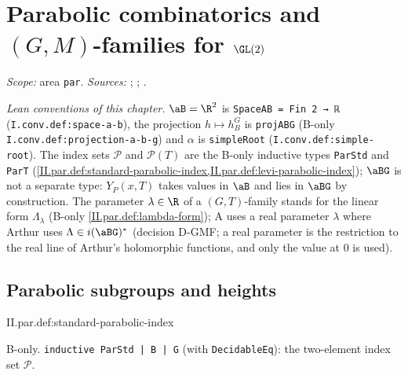 
\chapter{\texorpdfstring{Parabolic combinatorics and $(G,M)$-families for $\GL(2)$}{Parabolic combinatorics and (G,M)-families for GL(2)}}\label{ch:ch-02-parabolic}

\noindent\emph{Scope:} area \texttt{par}. \emph{Sources:} \cite[§§5, 17]{AIntro}; \cite[Lecture VII]{Gel}; \cite{A-FE2}.

\noindent\emph{Lean conventions of this chapter.} $\aB=\R^2$ is \texttt{SpaceAB = Fin 2 → ℝ} (\texttt{I.conv.def:space-a-b}), the projection
$h\mapsto h_B^G$ is \texttt{projABG} (B-only \texttt{I.conv.def:projection-a-b-g}) and $\alpha$ is \texttt{simpleRoot} (\texttt{I.conv.def:simple-root}). The index
sets $\mathcal P$ and $\mathcal P(T)$ are the B-only inductive types \texttt{ParStd} and \texttt{ParT} (\cref{II.par.def:standard-parabolic-index,II.par.def:levi-parabolic-index});
$\aBG$ is not a separate type: $Y_P(x,T)$ takes values in $\aB$ and lies in $\aBG$ by construction. The parameter $\lambda\in\R$ of a $(G,T)$-family stands
for the linear form $\Lambda_\lambda$ (B-only \cref{II.par.def:lambda-form}); A uses a real parameter $\lambda$ where Arthur uses $\Lambda\in i(\aBG)^*$ (decision
D-GMF; a real parameter is the restriction to the real line of Arthur's holomorphic functions, and only the value at $0$ is used).

\section{Parabolic subgroups and heights}\label{sec:par-heights}

\begin{definition}
\bonly
{}
\end{definition}
\begin{tfformal}{II.par.def:standard-parabolic-index}
\begin{tffidelity}
B-only. \texttt{inductive ParStd | B | G} (with \texttt{DecidableEq}): the two-element index set $\mathcal P$.
\end{tffidelity}
\end{tfformal}

